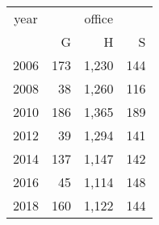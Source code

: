 \footnotesize\begin{tabular}[t]{lrrr}
\toprule
\multicolumn{1}{c}{year} & \multicolumn{3}{c}{office} \\
\cmidrule(l{3pt}r{3pt}){1-1} \cmidrule(l{3pt}r{3pt}){2-4}
  & G & H & S\\
\midrule
2006 & 173 & 1,230 & 144\\
2008 & 38 & 1,260 & 116\\
2010 & 186 & 1,365 & 189\\
2012 & 39 & 1,294 & 141\\
2014 & 137 & 1,147 & 142\\
2016 & 45 & 1,114 & 148\\
2018 & 160 & 1,122 & 144\\
\bottomrule
\end{tabular}
